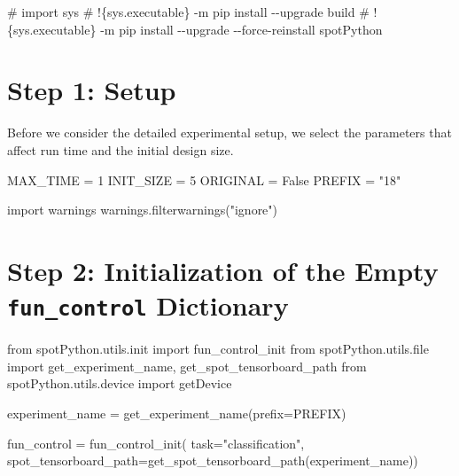 \documentclass[
  letterpaper,
  DIV=11,
  numbers=noendperiod]{scrreprt}
\newenvironment{Shaded}{\begin{snugshade}}{\end{snugshade}}
\newcommand{\BuiltInTok}[1]{\textcolor[rgb]{0.00,0.23,0.31}{#1}}
\newcommand{\CommentTok}[1]{\textcolor[rgb]{0.37,0.37,0.37}{#1}}
\newcommand{\DecValTok}[1]{\textcolor[rgb]{0.68,0.00,0.00}{#1}}
\newcommand{\ImportTok}[1]{\textcolor[rgb]{0.00,0.46,0.62}{#1}}
\newcommand{\NormalTok}[1]{\textcolor[rgb]{0.00,0.23,0.31}{#1}}
\newcommand{\OperatorTok}[1]{\textcolor[rgb]{0.37,0.37,0.37}{#1}}
\newcommand{\StringTok}[1]{\textcolor[rgb]{0.13,0.47,0.30}{#1}}
\newcommand{\VariableTok}[1]{\textcolor[rgb]{0.07,0.07,0.07}{#1}}
\begin{document}
\begin{Shaded}
\begin{Highlighting}[]
\CommentTok{\# import sys}
\CommentTok{\# !\{sys.executable\} {-}m pip install {-}{-}upgrade build}
\CommentTok{\# !\{sys.executable\} {-}m pip install {-}{-}upgrade {-}{-}force{-}reinstall spotPython}
\end{Highlighting}
\end{Shaded}

\hypertarget{sec-setup-18}{%
\section{Step 1: Setup}\label{sec-setup-18}}

Before we consider the detailed experimental setup, we select the
parameters that affect run time and the initial design size.

\begin{Shaded}
\begin{Highlighting}[]
\NormalTok{MAX\_TIME }\OperatorTok{=} \DecValTok{1}
\NormalTok{INIT\_SIZE }\OperatorTok{=} \DecValTok{5}
\NormalTok{ORIGINAL }\OperatorTok{=} \VariableTok{False}
\NormalTok{PREFIX }\OperatorTok{=} \StringTok{"18"}
\end{Highlighting}
\end{Shaded}

\begin{Shaded}
\begin{Highlighting}[]
\ImportTok{import}\NormalTok{ warnings}
\NormalTok{warnings.filterwarnings(}\StringTok{"ignore"}\NormalTok{)}
\end{Highlighting}
\end{Shaded}

\hypertarget{step-2-initialization-of-the-empty-fun_control-dictionary-3}{%
\section{\texorpdfstring{Step 2: Initialization of the Empty
\texttt{fun\_control}
Dictionary}{Step 2: Initialization of the Empty fun\_control Dictionary}}\label{step-2-initialization-of-the-empty-fun_control-dictionary-3}}

\begin{Shaded}
\begin{Highlighting}[]
\ImportTok{from}\NormalTok{ spotPython.utils.init }\ImportTok{import}\NormalTok{ fun\_control\_init}
\ImportTok{from}\NormalTok{ spotPython.utils.}\BuiltInTok{file} \ImportTok{import}\NormalTok{ get\_experiment\_name, get\_spot\_tensorboard\_path}
\ImportTok{from}\NormalTok{ spotPython.utils.device }\ImportTok{import}\NormalTok{ getDevice}

\NormalTok{experiment\_name }\OperatorTok{=}\NormalTok{ get\_experiment\_name(prefix}\OperatorTok{=}\NormalTok{PREFIX)}

\NormalTok{fun\_control }\OperatorTok{=}\NormalTok{ fun\_control\_init(}
\NormalTok{    task}\OperatorTok{=}\StringTok{"classification"}\NormalTok{,}
\NormalTok{    spot\_tensorboard\_path}\OperatorTok{=}\NormalTok{get\_spot\_tensorboard\_path(experiment\_name))}
\end{Highlighting}
\end{Shaded}
\end{document}
